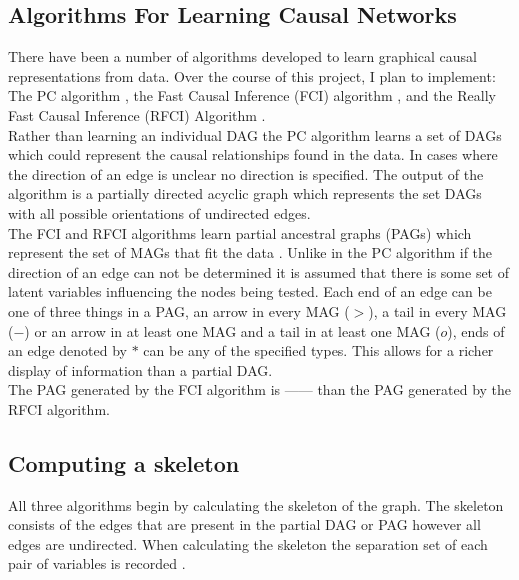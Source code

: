 \documentclass{article}
\begin{document}
\subsection{Algorithms For Learning Causal Networks}
 There have been a number of algorithms developed to learn graphical causal representations from data. Over the course of this project, I plan to implement: The PC algorithm \cite{spirtes1991algorithm}, the Fast Causal Inference (FCI) algorithm \cite{colombo2012learning}, and the Really Fast Causal Inference (RFCI) Algorithm \cite{colombo2012learning}.
\\

Rather than learning an individual DAG the PC algorithm learns a set of DAGs which could represent the causal relationships found in the data. In cases where the direction of an edge is unclear no direction is specified. The output of the algorithm is a partially directed acyclic graph which represents the set DAGs with all possible orientations of undirected edges\cite{spirtes1991algorithm}.
\\

The FCI and RFCI algorithms learn partial ancestral graphs (PAGs) which represent the set of MAGs that fit the data \cite{colombo2012learning}. Unlike in the PC algorithm if the direction of an edge can not be determined it is assumed that there is some set of latent variables influencing the nodes being tested. Each end of an edge can be one of three things in a PAG, an arrow in every MAG ($>$), a tail in every MAG ($-$) or an arrow in at least one MAG and a tail in at least one MAG ($o$), ends of an edge denoted by $*$ can be any of the specified types. This allows for a richer display of information than a partial DAG\cite{colombo2012learning}.
\\
The PAG generated by the FCI algorithm is 
------
than the PAG generated by the RFCI algorithm.
\\

\subsection{Computing a skeleton}
All three algorithms begin by calculating the skeleton of the graph. The skeleton consists of the edges that are present in the partial DAG or PAG however all edges are undirected. When calculating the skeleton the separation set of each pair of variables is recorded \cite{colombo2012learning, spirtes1991algorithm}.
\\
\end{document}
